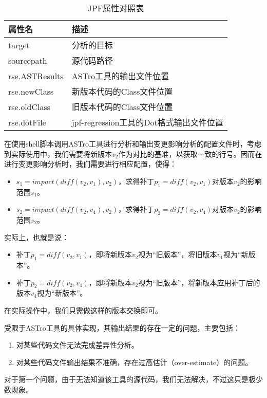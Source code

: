 \begin{table}
	\caption{JPF属性对照表}
	\label{JPF_prop}
	\centering
	    \begin{tabular*}{\linewidth}{lp{10cm}}
	    	\toprule[1.5pt]
	    	{\heiti 属性名} & {\heiti 描述} \\\midrule[1pt]
	    	target & 分析的目标 \\
	    	sourcepath & 源代码路径\\
	    	rse.ASTResults & ASTro工具的输出文件位置\\
	    	rse.newClass & 新版本代码的Class文件位置\\
	    	rse.oldClass    & 旧版本代码的Class文件位置\\
	    	rse.dotFile   & jpf-regression工具的Dot格式输出文件位置\\
	    	\bottomrule[1.5pt]
	    \end{tabular*}
\end{table}

在使用shell脚本调用ASTro工具进行分析和输出变更影响分析的配置文件时，考虑到实际使用中，我们需要将新版本$v_2$作为对比的基准，以获取一致的行号。因而在进行变更影响分析时，我们需要进行相应配置，使得：
\begin{itemize}
	\item $s_1 = impact(diff(v_2,v_1),v_2)$，求得补丁$p_1 = diff(v_2,v_1)$对版本$v_2$的影响范围$s_1$。
	\item $s_2 = impact(diff(v_2,v_4),v_2)$，求得补丁$p_2 = diff(v_2,v_4)$对版本$v_2$的影响范围$s_2$。
\end{itemize}

实际上，也就是说：
\begin{itemize}
	\item 补丁$p_1 = diff(v_2,v_1)$，即将新版本$v_2$视为“旧版本”，将旧版本$v_1$视为“新版本”。
	\item 补丁$p_2 = diff(v_2,v_4)$，即将新版本$v_2$视为“旧版本”，将新版本应用补丁后的版本$v_4$视为“新版本”。
\end{itemize}

在实际操作中，我们只需做这样的版本交换即可。

受限于ASTro工具的具体实现，其输出结果的存在一定的问题，主要包括：
\begin{enumerate}
	\item 对某些代码文件无法完成差异性分析。
	\item 对某些代码文件输出结果不准确，存在过高估计（over-estimate）的问题。
\end{enumerate}

对于第一个问题，由于无法知道该工具的源代码，我们无法解决，不过这只是极少数现象。


